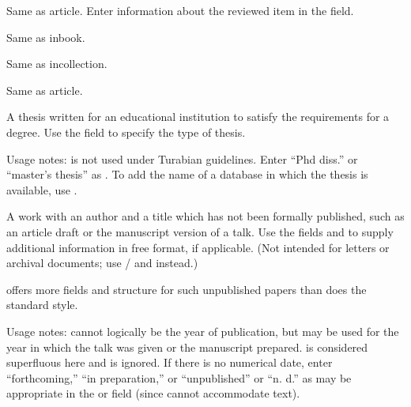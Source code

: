 \documentclass{ltxdockit}[2010/02/12]
\begin{document}
\begin{typelist}
 Same as article.
Enter information about the reviewed item in the  field. 


 Same as inbook.


 Same as incollection.


 Same as article.



A thesis written for an educational institution to satisfy the requirements for a degree. Use the  field to specify the type of thesis.


Usage notes:  is not used under Turabian guidelines. Enter ``Phd diss.'' or ``master's thesis'' as . To add the name of a database in which the thesis is available, use .



A work with an author and a title which has not been formally published, such as an article draft or the manuscript version of a talk. Use the fields  and  to supply additional information in free format, if applicable. (Not intended for letters or archival documents; use / and  instead.)

 offers more fields and structure for such unpublished papers than does the  standard style.



Usage notes:  cannot logically be the year of publication, but may be used for the year in which the talk was given or the manuscript prepared.  is considered superfluous here and is ignored. If there is no numerical date, enter ``forthcoming,'' ``in preparation,'' or ``unpublished'' or ``n. d.'' as may be appropriate in the  or  field (since  cannot accommodate text).


\end{typelist}
\end{document}
